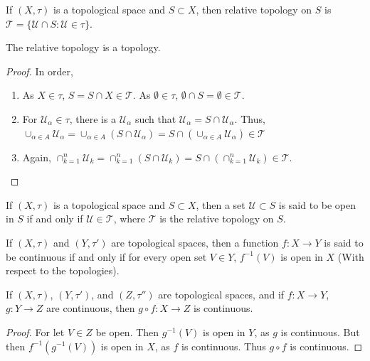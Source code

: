 \documentclass[crop=false,class=book,oneside]{standalone}
\begin{document}
            \begin{definition}
            If $(X,\tau)$ is a topological space and $S\subset X$, then relative topology on $S$ is $\mathscr{T}=\{\mathcal{U}\cap S:\mathcal{U}\in \tau\}$.
            \end{definition}
            \begin{theorem}
            The relative topology is a topology.
            \end{theorem}
            \begin{proof}
            In order,
            \begin{enumerate}
            \item As $X\in \tau$, $S=S\cap X \in \mathscr{T}$. As $\emptyset\in \tau$, $\emptyset\cap S = \emptyset \in \mathscr{T}$. 
            \item For $\mathscr{U}_\alpha\in \mathscr{\tau}$, there is a $\mathcal{U}_\alpha$ such that $\mathscr{U}_\alpha = S\cap \mathcal{U}_\alpha$. Thus, $\cup_{\alpha \in A} \mathscr{U}_\alpha = \cup_{\alpha \in A}(S\cap \mathcal{U}_\alpha) = S\cap (\cup_{\alpha \in A}\mathscr{U}_\alpha)\in \mathscr{T}$
            \item Again, $\cap_{k=1}^{n} \mathscr{U}_k = \cap_{k=1}^{n}(S\cap \mathcal{U}_k) = S\cap (\cap_{k=1}^{n} \mathcal{U}_k)\in \mathscr{T}$.
            \end{enumerate}
            \end{proof}
            \begin{definition}
            If $(X,\tau)$ is a topological space and $S\subset X$, then a set $\mathcal{U}\subset S$ is said to be open in $S$ if and only if $\mathcal{U}\in \mathscr{T}$, where $\mathscr{T}$ is the relative topology on $S$.
            \end{definition}
            \begin{definition}
            If $(X,\tau)$ and $(Y,\tau')$ are topological spaces, then a function $f:X\rightarrow Y$ is said to be continuous if and only if for every open set $V\in Y$, $f^{-1}(V)$ is open in $X$ (With respect to the topologies).
            \end{definition}
            \begin{theorem}
            If $(X,\tau)$, $(Y,\tau')$, and $(Z,\tau'')$ are topological spaces, and if $f:X\rightarrow Y$, $g:Y\rightarrow Z$ are continuous, then $g\circ f:X\rightarrow Z$ is continuous.
            \end{theorem}
            \begin{proof}
            For let $V\in Z$ be open. Then $g^{-1}(V)$ is open in $Y$, as $g$ is continuous. But then $f^{-1}(g^{-1}(V))$ is open in $X$, as $f$ is continuous. Thus $g\circ f$ is continuous.
            \end{proof}
\end{document}
